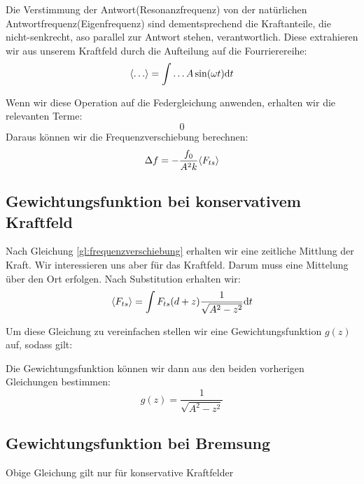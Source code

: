 Die Verstimmung der Antwort(Resonanzfrequenz) von der natürlichen Antwortfrequenz(Eigenfrequenz) sind dementsprechend die Kraftanteile, die nicht-senkrecht, aso parallel zur Antwort stehen, verantwortlich. 
Diese extrahieren wir aus unserem Kraftfeld durch die Aufteilung auf die Fourrierereihe:
\begin{equation}
	\mitlungz{ \dots } = \int \dots A \sin (\omega t) \mathrm{d} t
\end{equation}

Wenn wir diese Operation auf die Federgleichung anwenden, erhalten wir die relevanten Terme:
\begin{equation}
	0
\end{equation}
Daraus können wir die Frequenzverschiebung berechnen:
\begin{equation}
	\Delta f = - \frac{f_0}{A^2 k } \langle F_{ts} \rangle \label{gl:frequenzverschiebung}
\end{equation}


\subsection{Gewichtungsfunktion bei konservativem Kraftfeld}

Nach Gleichung \ref{gl:frequenzverschiebung} erhalten wir eine zeitliche Mittlung der Kraft. Wir interessieren uns aber für das Kraftfeld. Darum muss eine Mittelung über den Ort erfolgen.
Nach Substitution erhalten wir:
\begin{equation}
	\langle F_{ts} \rangle = \int F_{ts}(d + z) \frac{1}{\sqrt{A^2 - z^2}} \mathrm{d}t
\end{equation}

Um diese Gleichung zu vereinfachen stellen wir eine Gewichtungsfunktion $g(z)$ auf, sodass gilt:
\begin{equation}
\end{equation}

Die Gewichtungsfunktion können wir dann aus den beiden vorherigen Gleichungen bestimmen:
\begin{equation}
	g(z) = \frac{1}{\sqrt{A^2 - z^2}}
\end{equation}


\subsection{Gewichtungsfunktion bei Bremsung}
Obige Gleichung gilt nur für konservative Kraftfelder
